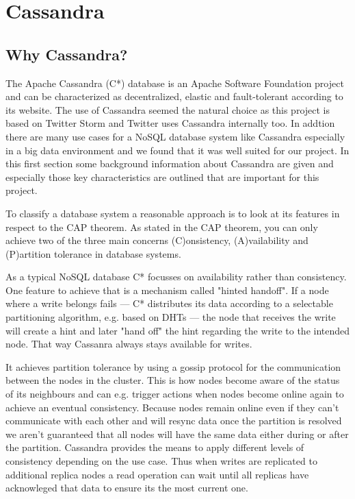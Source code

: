\section{Cassandra}
\label{sect:Cassandra}
\subsection{Why Cassandra?}
\label{sect:why}
The Apache Cassandra (C*) database is an Apache Software Foundation project and can be characterized as decentralized, elastic and fault-tolerant according to its website. The use of Cassandra seemed the natural choice as this project is based on Twitter Storm and Twitter uses Cassandra internally too. In addtion there are many use cases for a NoSQL database system like Cassandra especially in a big data environment and we found that it was well suited for our project. In this first section some background information about Cassandra are given and especially those key characteristics are outlined that are important for this project. 

To classify a database system a reasonable approach is to look at its features in respect to the CAP theorem. As stated in the CAP theorem, you can only achieve two of the three main concerns (C)onsistency, (A)vailability and (P)artition tolerance in database systems. 

As a typical NoSQL database C* focusses on availability rather than consistency. One feature to achieve that is a mechanism called "hinted handoff". If a node where a write belongs fails --- C* distributes its data according to a selectable partitioning algorithm, e.g. based on DHTs --- the node that receives the write will create a hint and later "hand off" the hint regarding the write to the intended node. That way Cassanra always stays available for writes.

It achieves partition tolerance by using a gossip protocol for the communication between the nodes in the cluster. This is how nodes become aware of the status of its neighbours and can e.g. trigger actions when nodes become online again to achieve an eventual consistency. Because nodes remain online even if they can't communicate with each other and will resync data once the partition is resolved we aren't guaranteed that all nodes will have the same data either during or after the partition. Cassandra provides the means to apply different levels of consistency depending on the use case. Thus when writes are replicated to additional replica nodes a read operation can wait until all replicas have acknowleged that data to ensure its the most current one.


